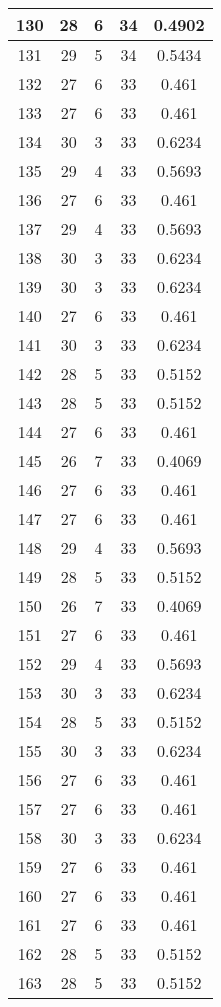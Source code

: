 \documentclass[letterpaper, 12pt]{article}
\begin{document}
\begin{longtable}{|c|c|c|c|c|}
\hline
130 & 28 & 6 & 34 & 0.4902 \\
\hline
131 & 29 & 5 & 34 & 0.5434 \\
\hline
132 & 27 & 6 & 33 & 0.461 \\
\hline
133 & 27 & 6 & 33 & 0.461 \\
\hline
134 & 30 & 3 & 33 & 0.6234 \\
\hline
135 & 29 & 4 & 33 & 0.5693 \\
\hline
136 & 27 & 6 & 33 & 0.461 \\
\hline
137 & 29 & 4 & 33 & 0.5693 \\
\hline
138 & 30 & 3 & 33 & 0.6234 \\
\hline
139 & 30 & 3 & 33 & 0.6234 \\
\hline
140 & 27 & 6 & 33 & 0.461 \\
\hline
141 & 30 & 3 & 33 & 0.6234 \\
\hline
142 & 28 & 5 & 33 & 0.5152 \\
\hline
143 & 28 & 5 & 33 & 0.5152 \\
\hline
144 & 27 & 6 & 33 & 0.461 \\
\hline
145 & 26 & 7 & 33 & 0.4069 \\
\hline
146 & 27 & 6 & 33 & 0.461 \\
\hline
147 & 27 & 6 & 33 & 0.461 \\
\hline
148 & 29 & 4 & 33 & 0.5693 \\
\hline
149 & 28 & 5 & 33 & 0.5152 \\
\hline
150 & 26 & 7 & 33 & 0.4069 \\
\hline
151 & 27 & 6 & 33 & 0.461 \\
\hline
152 & 29 & 4 & 33 & 0.5693 \\
\hline
153 & 30 & 3 & 33 & 0.6234 \\
\hline
154 & 28 & 5 & 33 & 0.5152 \\
\hline
155 & 30 & 3 & 33 & 0.6234 \\
\hline
156 & 27 & 6 & 33 & 0.461 \\
\hline
157 & 27 & 6 & 33 & 0.461 \\
\hline
158 & 30 & 3 & 33 & 0.6234 \\
\hline
159 & 27 & 6 & 33 & 0.461 \\
\hline
160 & 27 & 6 & 33 & 0.461 \\
\hline
161 & 27 & 6 & 33 & 0.461 \\
\hline
162 & 28 & 5 & 33 & 0.5152 \\
\hline
163 & 28 & 5 & 33 & 0.5152 \\

\end{longtable}
\end{document}
